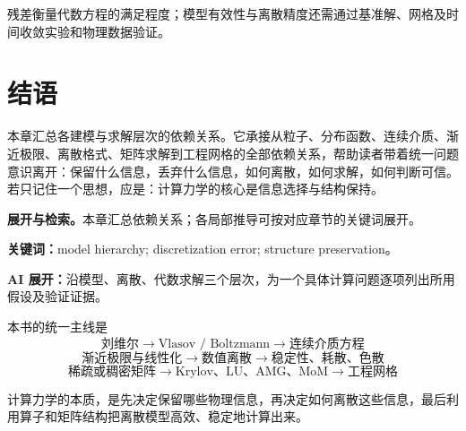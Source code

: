 \documentclass[11pt,openany]{ctexbook}
\newcommand{\studyroute}[3]{%
  \par\smallskip\noindent\textbf{展开与检索。}#1\par
  \noindent\textbf{关键词：}#2。\par
  \noindent\textbf{AI 展开：}#3\par
}
\begin{document}
残差衡量代数方程的满足程度；模型有效性与离散精度还需通过基准解、网格及时间收敛实验和物理数据验证。

\chapter{结语}

\begin{chaptersummary}
本章汇总各建模与求解层次的依赖关系。它承接从粒子、分布函数、连续介质、渐近极限、离散格式、矩阵求解到工程网格的全部依赖关系，帮助读者带着统一问题意识离开：保留什么信息，丢弃什么信息，如何离散，如何求解，如何判断可信。若只记住一个思想，应是：计算力学的核心是信息选择与结构保持。
\end{chaptersummary}
\studyroute{本章汇总依赖关系；各局部推导可按对应章节的关键词展开。}{model hierarchy; discretization error; structure preservation}{沿模型、离散、代数求解三个层次，为一个具体计算问题逐项列出所用假设及验证证据。}

本书的统一主线是
\[
\boxed{
\text{刘维尔}
\rightarrow
\text{Vlasov / Boltzmann}
\rightarrow
\text{连续介质方程}
}
\]
\[
\boxed{
\text{渐近极限与线性化}
\rightarrow
\text{数值离散}
\rightarrow
\text{稳定性、耗散、色散}
}
\]
\[
\boxed{
\text{稀疏或稠密矩阵}
\rightarrow
\text{Krylov、LU、AMG、MoM}
\rightarrow
\text{工程网格}
}
\]

计算力学的本质，是先决定保留哪些物理信息，再决定如何离散这些信息，最后利用算子和矩阵结构把离散模型高效、稳定地计算出来。
\end{document}
